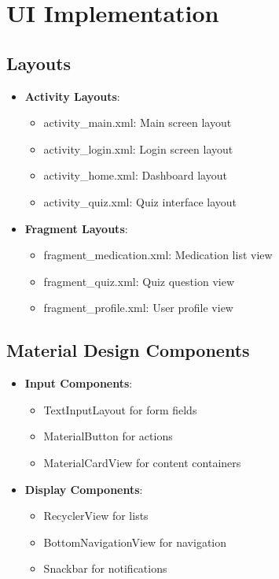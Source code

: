 \section{UI Implementation}
\subsection{Layouts}
\begin{itemize}
    \item \textbf{Activity Layouts}:
    \begin{itemize}
        \item activity\_main.xml: Main screen layout
        \item activity\_login.xml: Login screen layout
        \item activity\_home.xml: Dashboard layout
        \item activity\_quiz.xml: Quiz interface layout
    \end{itemize}
    
    \item \textbf{Fragment Layouts}:
    \begin{itemize}
        \item fragment\_medication.xml: Medication list view
        \item fragment\_quiz.xml: Quiz question view
        \item fragment\_profile.xml: User profile view
    \end{itemize}
\end{itemize}

\subsection{Material Design Components}
\begin{itemize}
    \item \textbf{Input Components}:
    \begin{itemize}
        \item TextInputLayout for form fields
        \item MaterialButton for actions
        \item MaterialCardView for content containers
    \end{itemize}
    
    \item \textbf{Display Components}:
    \begin{itemize}
        \item RecyclerView for lists
        \item BottomNavigationView for navigation
        \item Snackbar for notifications
    \end{itemize}
\end{itemize}

